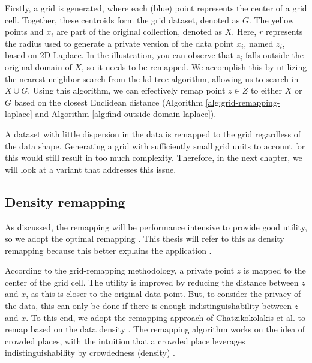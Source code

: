 Firstly, a grid is generated, where each (blue) point represents the center of a grid cell.
Together, these centroids form the grid dataset, denoted as $G$.
The yellow points and $x_i$ are part of the original collection, denoted as $X$.
Here, $r$ represents the radius used to generate a private version of the data point $x_i$, named $z_i$, based on 2D-Laplace.
In the illustration, you can observe that $z_i$ falls outside the original domain of $X$, so it needs to be remapped.
We accomplish this by utilizing the nearest-neighbor search from the kd-tree algorithm, allowing us to search in $X \cup G$.
Using this algorithm, we can effectively remap point $z \in Z$ to either $X$ or $G$ based on the closest Euclidean distance (Algorithm \ref{alg:grid-remapping-laplace} and Algorithm \ref{alg:find-outside-domain-laplace}).

A dataset with little dispersion in the data is remapped to the grid regardless of the data shape. 
Generating a grid with sufficiently small grid units to account for this would still result in too much complexity. 
Therefore, in the next chapter, we will look at a variant that addresses this issue.



\newpage
\subsection{Density remapping} \label{theory:optimal-remapping}
As discussed, the remapping will be performance intensive to provide good utility, so we adopt the optimal remapping \citep{chatzikokolakis_efficient_2017}.
This thesis will refer to this as density remapping because this better explains the application .

According to the grid-remapping methodology, a private point $z$ is mapped to the center of the grid cell.
The utility is improved by reducing the distance between $z$ and $x$, as this is closer to the original data point.
But, to consider the privacy of the data, this can only be done if there is enough indistinguishability between $z$ and $x$.
To this end, we adopt the remapping approach of Chatzikokolakis et al. to remap based on the data density \citep{chatzikokolakis_efficient_2017}.
The remapping algorithm works on the idea of crowded places, with the intuition that a crowded place leverages indistinguishability by crowdedness (density) \citep{chatzikokolakis_efficient_2017}.  \newline

